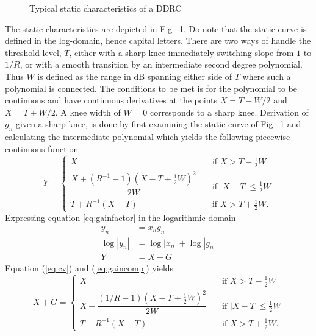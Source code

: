 \documentclass[../main2.tex]{subfiles}
\providecommand{\rootdir}{..}
\begin{document}
\begin{figure}
\centerline{}
\caption{Typical static characteristics of a DDRC}
\label{fig:typical_static_detailed}
\end{figure}
The static characteristics are depicted in Fig ~\ref{fig:typical_static_detailed}. Do note that the static curve is defined in the log-domain, hence capital letters. There are two ways of handle the threshold level, $T$, either with a sharp knee immediately switching slope from $1$ to $1/R$, or with a smooth transition by an intermediate second degree polynomial\cite{frindle1996implementation}\cite{reiss2012tutorial}. Thus $W$ is defined as the range in dB spanning either side of $T$ where such a polynomial is connected. The conditions to be met is for the polynomial to be continuous and have continuous derivatives at the points $X=T-W/2$ and $X=T+W/2$. A knee width of $W=0$ corresponds to a sharp knee. Derivation of $g_n$ given a sharp knee, is done by first examining the static curve of Fig ~\ref{fig:typical_static_detailed} and calculating the intermediate polynomial which yields the following piecewise continuous function
\begin{equation} \label{eq:gaincomp}
Y = \begin{cases}
    X & \quad \text{if }X> T-\frac{1}{2}W \\[0.8em]
    \dfrac{X+(R^{-1}-1)(X-T+\frac{1}{2}W)^2}{2W}& \quad \text{if } |X-T| \leq \frac{1}{2}W\\[1.2em]
    T+ R^{-1}(X-T) & \quad \text{if } X > T + \frac{1}{2}W.
\end{cases}
\end{equation}
Expressing equation \eqref{eq:gainfactor} in the logarithmic domain
\begin{align}
y_n &= x_ng_n   \\
\log|y_n| & = \log|x_n| + \log|g_n|   \\
Y &= X + G \label{eq:cv}
\end{align}
Equation (\ref{eq:cv}) and (\ref{eq:gaincomp}) yields
\begin{equation}
X+G = \begin{cases}
    X & \quad \text{if }X > T-\frac{1}{2}W \\[0.8em]
    X + \dfrac{(1/R-1)(X-T+\frac{1}{2}W)^2}{2W}& \quad \text{if } |X-T| \leq \frac{1}{2}W\\[1.2em]
    T+ R^{-1}(X-T) & \quad \text{if } X > T + \frac{1}{2}W.
\end{cases}
\end{equation}
\end{document}

